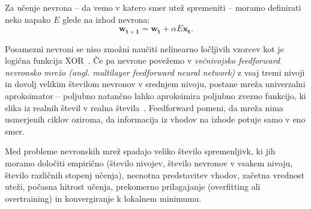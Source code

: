 \documentclass[a4paper, oneside, 12pt]{report}
\begin{document}

Za učenje nevrona -- da vemo v katero smer utež spremeniti -- moramo definirati neko napako $E$ glede na izhod nevrona:
\begin{equation}
\mathbf{w_{t+1}} = \mathbf{w_t} + \alpha E \mathbf{x_t}.
\end{equation}

Posamezni nevroni se niso zmožni naučiti nelinearno ločljivih vzorcev kot je logična funkcija XOR~\cite{Perceptrons}. Če pa nevrone povežemo v {\em večnivojsko feedforward nevronsko mrežo (angl. multilayer feedforward neural network)} z vsaj tremi nivoji in dovolj velikim številom nevronov v srednjem nivoju, postane mreža univerzalni aproksimator -- poljubno natančno lahko aproksimira poljubno zvezno funkcijo, ki slika iz realnih števil v realna števila~\cite{MultilayerFeedforwardNetworksAreUniversalApproximators}. Feedforward pomeni, da mreža nima usmerjenih ciklov oziroma, da informacija iz vhodov na izhode potuje samo v eno smer.

Med probleme nevronskih mrež spadajo veliko število spremenljivk, ki jih moramo določiti empirično (število nivojev, število nevronov v vsakem nivoju, število različnih stopenj učenja), neenotna predstavitev vhodov, začetna vrednost uteži, počasna hitrost učenja, prekomerno prilagajanje (overfitting ali overtraining) in konvergiranje k lokalnem minimumu.


\end{document}

